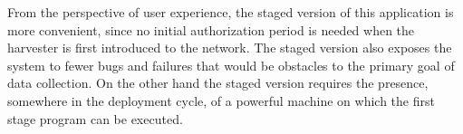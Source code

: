 From the perspective of user experience, the staged version of this application is more
convenient, since no initial authorization period is needed when the harvester is first
introduced to the network. The staged version also exposes the system to fewer bugs and failures
that would be obstacles to the primary goal of data collection. On the other hand the staged
version requires the presence, somewhere in the deployment cycle, of a powerful machine on which
the first stage program can be executed.

